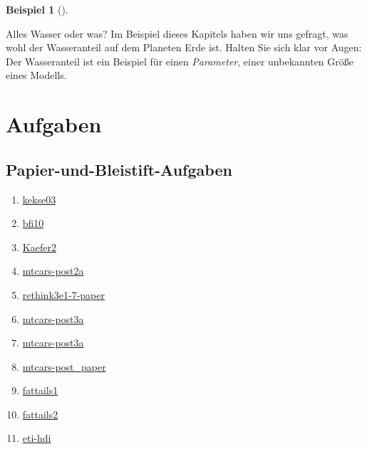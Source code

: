 \documentclass[
  ngerman,
  letterpaper,
  twoside,
  open=any]{scrbook}
\providecommand{\tightlist}{%
  \setlength{\itemsep}{0pt}\setlength{\parskip}{0pt}}\usepackage{longtable,booktabs,array}
\theoremstyle{definition}
\newtheorem{example}{Beispiel}[chapter]
\theoremstyle{plain}
\theoremstyle{definition}
\theoremstyle{definition}
\theoremstyle{remark}
\begin{document}
\begin{example}[]
\begin{tcolorbox}[enhanced jigsaw, arc=.35mm, bottomrule=.15mm, bottomtitle=1mm, breakable, colback=white, colbacktitle=quarto-callout-important-color!10!white, colframe=quarto-callout-important-color-frame, coltitle=black, left=2mm, leftrule=.75mm, opacityback=0, opacitybacktitle=0.6, rightrule=.15mm, title=\textcolor{quarto-callout-important-color}{\faExclamation}\hspace{0.5em}{Wichtig}, titlerule=0mm, toprule=.15mm, toptitle=1mm]

Alles Wasser oder was? Im Beispiel dieses Kapitels haben wir uns
gefragt, was wohl der Wasseranteil auf dem Planeten Erde ist. Halten Sie
sich klar vor Augen: Der Wasseranteil ist ein Beispiel für einen
\emph{Parameter}, einer unbekannten Größe eines Modells.

\end{tcolorbox}

\section{Aufgaben}\label{aufgaben-6}

\subsection{Papier-und-Bleistift-Aufgaben}\label{papier-und-bleistift-aufgaben-1}

\begin{enumerate}
\def\labelenumi{\arabic{enumi}.}
\tightlist
\item
  \href{https://datenwerk.netlify.app/posts/kekse03/index.html}{kekse03}
\item
  \href{https://datenwerk.netlify.app/posts/bfi10/}{bfi10}
\item
  \href{https://datenwerk.netlify.app/posts/kaefer2/kaefer2}{Kaefer2}
\item
  \href{https://datenwerk.netlify.app/posts/mtcars-post2a/}{mtcars-post2a}
\item
  \href{https://datenwerk.netlify.app/posts/rethink3e1-7-paper/}{rethink3e1-7-paper}
\item
  \href{https://datenwerk.netlify.app/posts/mtcars-post3a/}{mtcars-post3a}
\item
  \href{https://datenwerk.netlify.app/posts/mtcars-post3a/}{mtcars-post3a}
\item
  \href{https://datenwerk.netlify.app/posts/mtcars-post_paper/}{mtcars-post\_paper}
\item
  \href{https://datenwerk.netlify.app/posts/fattails01/fattails01.html}{fattails1}
\item
  \href{https://datenwerk.netlify.app/posts/fattails02/fattails02.html}{fattails2}
\item
  \href{https://datenwerk.netlify.app/posts/eti-hdi/}{eti-hdi}
\end{enumerate}


\end{example}
\end{document}
